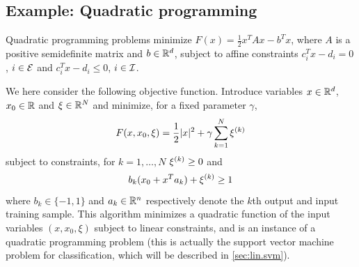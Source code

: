 %

\subsection{Example: Quadratic programming}
\label{sec:example.svm}
Quadratic programming problems minimize $F(x) = \frac12 x^TAx - b^Tx$, where $A$ is a positive semidefinite matrix and $b\in {\mathbb{R}}^d$,  subject to affine constraints $c_i^Tx - d_i = 0$, $i\in {\mathcal E}$ and $c_i^T x - d_i \leq 0$, $i\in{\mathcal I}$. 


We here consider the following objective function. Introduce variables $x\in {\mathbb{R}}^d$, $x_0\in {\mathbb{R}}$ and $\xi \in {\mathbb{R}}^N$ and minimize, for a fixed parameter $\gamma$,
\[
F(x, x_0, \xi) = \frac12 |x|^2 + \gamma \sum_{k=1}^N \xi^{(k)} 
\]
subject to constraints, for $k=1, \ldots, N$ $\xi^{(k)} \geq 0$ and 
\[
b_k(x_0 + x^Ta_k) + \xi^{(k)} \geq 1
\]
where $b_k\in \{-1,1\}$ and $a_k\in {\mathbb{R}}^n$ respectively denote the $k$th output and input training sample. This algorithm minimizes a quadratic function of the input variables $(x, x_0, \xi)$ subject to linear constraints, and is an instance of a quadratic programming problem (this is actually the support vector machine problem for classification, which will be described in \cref{sec:lin.svm}).

